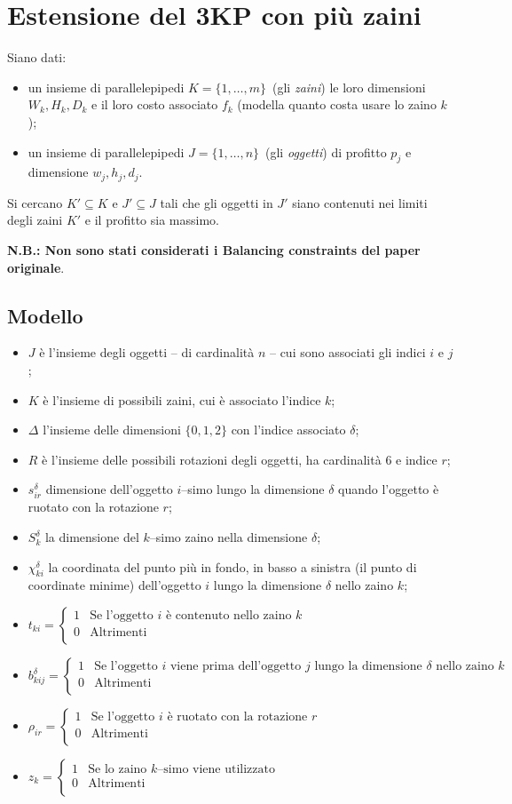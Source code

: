 \documentclass{scrartcl}
\newcommand{\MutliLineEquation}[3]{ 
	\ensuremath{
		#1 = \left\{
		\begin{array}{ll}
		1& \text{#2} \\
		0& \text{#3} \\
		\end{array}
		\right.
	}
}
\begin{document}
\section{Estensione del 3KP con più zaini}
\label{sec:extension1}

Siano dati:
\begin{itemize} 
	
	\item un insieme di parallelepipedi $K = \{1, \dots, m \}$\ (gli \emph{zaini}) le loro dimensioni $W_k, H_k, D_k$ e il loro costo associato $f_k$ (modella quanto costa usare lo zaino $k$);
	\item un insieme di parallelepipedi $J = \{1, \dots, n\}$\ (gli \emph{oggetti}) di profitto $p_j$ e dimensione $w_j, h_j, d_j$.
\end{itemize}

Si cercano $K' \subseteq K$ e $J' \subseteq J$ tali che gli oggetti in $J'$ siano contenuti nei limiti degli zaini $K'$ e il profitto sia massimo.


\textbf{N.B.: Non sono stati considerati i Balancing constraints del paper originale}.

\subsection{Modello}
\label{sec:modello:multi3BKP}
\begin{itemize}
	\item $J$ è l'insieme degli oggetti -- di cardinalità $n$ -- cui sono associati gli indici $i$ e $j$;
	\item $K$ è l'insieme di possibili zaini, cui è associato l'indice $k$;
	\item $\Delta$ l'insieme delle dimensioni $\{0,1,2\}$ con l'indice associato $\delta$;
	\item $R$ è l'insieme delle possibili rotazioni degli oggetti, ha cardinalità $6$ e indice $r$;
	\item $s_{ir}^\delta$ dimensione dell'oggetto $i$--simo lungo la dimensione $\delta$ quando l'oggetto è ruotato con la rotazione $r$;
	\item $S_{k}^\delta$ la dimensione del $k$--simo zaino nella dimensione $\delta$;
	\item $\chi_{ki}^\delta$ la coordinata del punto più in fondo, in basso a sinistra  (il punto di coordinate minime) dell'oggetto $i$ lungo la dimensione $\delta$ nello zaino $k$;
	\item \MutliLineEquation{t_{ki}}{Se l'oggetto $i$ è contenuto nello zaino $k$}{Altrimenti}
	\item \MutliLineEquation{b_{kij}^\delta}{Se l'oggetto $i$ viene prima dell'oggetto $j$ lungo la dimensione $\delta$ nello zaino $k$}{Altrimenti}
	\item \MutliLineEquation{\rho_{ir}}{Se l'oggetto $i$ è ruotato con la rotazione $r$}{Altrimenti}
	\item \MutliLineEquation{z_k}{Se lo zaino $k$--simo viene utilizzato}{Altrimenti}
	
\end{itemize}
\end{document}
